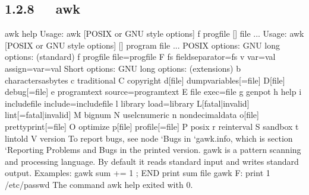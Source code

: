 \documentclass[letterpaper,12pt,english]{sphinxmanual}
\begin{document}
\subsection{1.2.8   awk}
\label{\detokenize{001software/001install/linux:awk}}
\begin{sphinxVerbatim}[commandchars=\\\{\}]
\PYGZdl{} awk \PYGZhy{}\PYGZhy{}help
Usage: awk [POSIX or GNU style options] \PYGZhy{}f progfile [\PYGZhy{}\PYGZhy{}] file ...
Usage: awk [POSIX or GNU style options] [\PYGZhy{}\PYGZhy{}] \PYGZsq{}program\PYGZsq{} file ...
POSIX options:    GNU long options: (standard)
  \PYGZhy{}f progfile   \PYGZhy{}\PYGZhy{}file=progfile
  \PYGZhy{}F fs     \PYGZhy{}\PYGZhy{}field\PYGZhy{}separator=fs
  \PYGZhy{}v var=val    \PYGZhy{}\PYGZhy{}assign=var=val
Short options:    GNU long options: (extensions)
  \PYGZhy{}b      \PYGZhy{}\PYGZhy{}characters\PYGZhy{}as\PYGZhy{}bytes
  \PYGZhy{}c      \PYGZhy{}\PYGZhy{}traditional
  \PYGZhy{}C      \PYGZhy{}\PYGZhy{}copyright
  \PYGZhy{}d[file]    \PYGZhy{}\PYGZhy{}dump\PYGZhy{}variables[=file]
  \PYGZhy{}D[file]    \PYGZhy{}\PYGZhy{}debug[=file]
  \PYGZhy{}e \PYGZsq{}program\PYGZhy{}text\PYGZsq{} \PYGZhy{}\PYGZhy{}source=\PYGZsq{}program\PYGZhy{}text\PYGZsq{}
  \PYGZhy{}E file     \PYGZhy{}\PYGZhy{}exec=file
  \PYGZhy{}g      \PYGZhy{}\PYGZhy{}gen\PYGZhy{}pot
  \PYGZhy{}h      \PYGZhy{}\PYGZhy{}help
  \PYGZhy{}i includefile    \PYGZhy{}\PYGZhy{}include=includefile
  \PYGZhy{}l library    \PYGZhy{}\PYGZhy{}load=library
  \PYGZhy{}L[fatal|invalid] \PYGZhy{}\PYGZhy{}lint[=fatal|invalid]
  \PYGZhy{}M      \PYGZhy{}\PYGZhy{}bignum
  \PYGZhy{}N      \PYGZhy{}\PYGZhy{}use\PYGZhy{}lc\PYGZhy{}numeric
  \PYGZhy{}n      \PYGZhy{}\PYGZhy{}non\PYGZhy{}decimal\PYGZhy{}data
  \PYGZhy{}o[file]    \PYGZhy{}\PYGZhy{}pretty\PYGZhy{}print[=file]
  \PYGZhy{}O      \PYGZhy{}\PYGZhy{}optimize
  \PYGZhy{}p[file]    \PYGZhy{}\PYGZhy{}profile[=file]
  \PYGZhy{}P      \PYGZhy{}\PYGZhy{}posix
  \PYGZhy{}r      \PYGZhy{}\PYGZhy{}re\PYGZhy{}interval
  \PYGZhy{}S      \PYGZhy{}\PYGZhy{}sandbox
  \PYGZhy{}t      \PYGZhy{}\PYGZhy{}lint\PYGZhy{}old
  \PYGZhy{}V      \PYGZhy{}\PYGZhy{}version
To report bugs, see node `Bugs\PYGZsq{} in `gawk.info\PYGZsq{}, which is
section `Reporting Problems and Bugs\PYGZsq{} in the printed version.
gawk is a pattern scanning and processing language.
By default it reads standard input and writes standard output.
Examples:
  gawk \PYGZsq{}\PYGZob{} sum += \PYGZdl{}1 \PYGZcb{}; END \PYGZob{} print sum \PYGZcb{}\PYGZsq{} file
  gawk \PYGZhy{}F: \PYGZsq{}\PYGZob{} print \PYGZdl{}1 \PYGZcb{}\PYGZsq{} /etc/passwd
The command \PYGZdq{}awk \PYGZhy{}\PYGZhy{}help\PYGZdq{} exited with 0.
\end{sphinxVerbatim}
\end{document}
